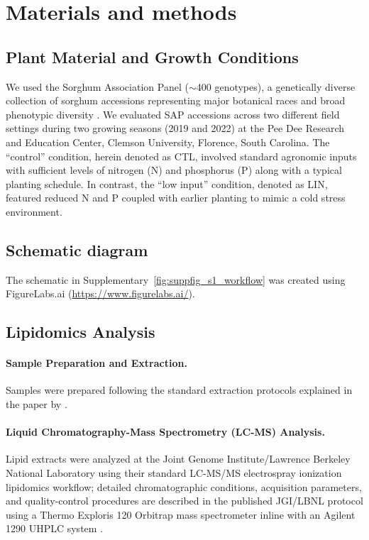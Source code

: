 \documentclass[9pt,twocolumn,twoside]{rilabRxiv}
\begin{document}
\section*{Materials and methods}

\subsection*{Plant Material and Growth Conditions}

We used the Sorghum Association Panel ($\sim$400 genotypes), a genetically diverse collection of sorghum accessions representing major botanical races and broad phenotypic diversity \citep{Casa2008CommunityResourcesSorghum, Boatwright2022}. We evaluated SAP accessions across two different field settings during two growing seasons (2019 and 2022) at the Pee Dee Research and Education Center, Clemson University, Florence, South Carolina. The ``control'' condition, herein denoted as CTL, involved standard agronomic inputs with sufficient levels of nitrogen (N) and phosphorus (P) along with a typical planting schedule. In contrast, the ``low input'' condition, denoted as LIN, featured reduced N and P coupled with earlier planting to mimic a cold stress environment.

\subsection*{Schematic diagram}

The schematic in Supplementary~\ref{fig:suppfig_s1_workflow} was created using FigureLabs.ai (\url{https://www.figurelabs.ai/}).

\subsection*{Lipidomics Analysis}

\paragraph{Sample Preparation and Extraction.}
Samples were prepared following the standard extraction protocols explained in the paper by \citep{Barnes2022}.

\paragraph{Liquid Chromatography-Mass Spectrometry (LC-MS) Analysis.}
Lipid extracts were analyzed at the Joint Genome Institute/Lawrence Berkeley National Laboratory using their standard LC-MS/MS electrospray ionization lipidomics workflow; detailed chromatographic conditions, acquisition parameters, and quality-control procedures are described in the published JGI/LBNL protocol using a Thermo Exploris 120 Orbitrap mass spectrometer inline with an Agilent 1290 UHPLC system \citep{Louie2025JGI_Lipids}.
\end{document}

